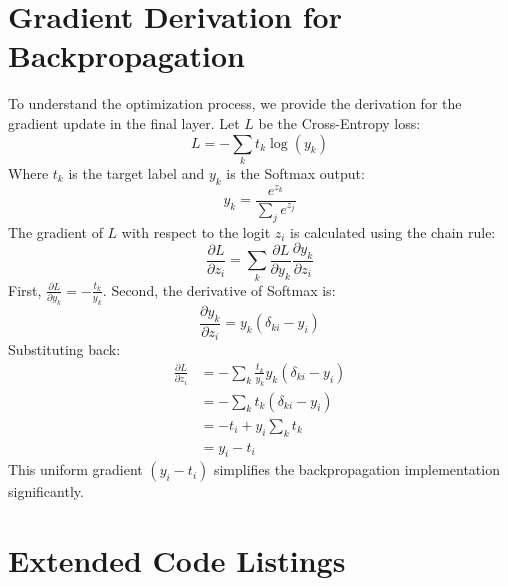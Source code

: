 \documentclass[journal]{IEEEtran}
\begin{document}
\balance

\appendices

\section{Gradient Derivation for Backpropagation}
To understand the optimization process, we provide the derivation for the gradient update in the final layer. Let $L$ be the Cross-Entropy loss:
\begin{equation}
L = - \sum_{k} t_k \log(y_k)
\end{equation}
Where $t_k$ is the target label and $y_k$ is the Softmax output:
\begin{equation}
y_k = \frac{e^{z_k}}{\sum_{j} e^{z_j}}
\end{equation}
The gradient of $L$ with respect to the logit $z_i$ is calculated using the chain rule:
\begin{equation}
\frac{\partial L}{\partial z_i} = \sum_{k} \frac{\partial L}{\partial y_k} \frac{\partial y_k}{\partial z_i}
\end{equation}
First, $\frac{\partial L}{\partial y_k} = -\frac{t_k}{y_k}$.
Second, the derivative of Softmax is:
\begin{equation}
\frac{\partial y_k}{\partial z_i} = y_k (\delta_{ki} - y_i)
\end{equation}
Substituting back:
\begin{align}
\frac{\partial L}{\partial z_i} &= - \sum_{k} \frac{t_k}{y_k} y_k (\delta_{ki} - y_i) \\
&= - \sum_{k} t_k (\delta_{ki} - y_i) \\
&= - t_i + y_i \sum_{k} t_k \\
&= y_i - t_i
\end{align}
This uniform gradient $(y_i - t_i)$ simplifies the backpropagation implementation significantly.

\section{Extended Code Listings}
\end{document}
